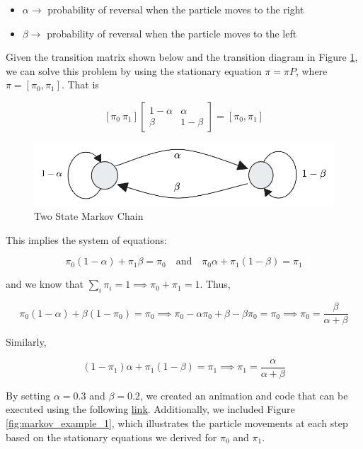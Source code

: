 \documentclass[a4paper,10pt]{article}
\begin{document}
\begin{itemize}
    \item $\alpha \rightarrow$ probability of reversal when the particle moves to the right 
    \item $\beta \rightarrow$ probability of reversal when the particle moves to the left 
\end{itemize}

Given the transition matrix shown below and the transition diagram in Figure \ref{fig:two_state_markov}, we can solve this problem by using the stationary equation $\pi = \pi P$, where $\pi = [\pi_0, \pi_1]$. That is

\[
[\pi_0 \ \pi_1] \begin{bmatrix}
1 - \alpha & \alpha \\
\beta & 1 - \beta 
\end{bmatrix} = [\pi_0, \pi_1]
\]

\begin{figure}[ht]
\centering
\includegraphics[width=0.6\linewidth]{Figures/two_state_markov.png}
\caption{Two State Markov Chain}
\label{fig:two_state_markov}
\end{figure}

This implies the system of equations:

\[
\pi_0(1 - \alpha) + \pi_1 \beta = \pi_0 \quad \text{and} \quad \pi_0 \alpha + \pi_1(1 - \beta) = \pi_1
\]

and we know that $\sum_i \pi_i = 1 \implies \pi_0 + \pi_1 = 1$. Thus,

\[
\pi_0(1 - \alpha) + \beta(1 - \pi_0) = \pi_0 \implies \pi_0 - \alpha \pi_0 + \beta - \beta \pi_0 = \pi_0 \implies \pi_0 = \frac{\beta}{\alpha + \beta}
\]

Similarly,

\[
(1 - \pi_1)\alpha + \pi_1(1 - \beta) = \pi_1 \implies \pi_1 = \frac{\alpha}{\alpha + \beta}
\]

By setting $\alpha = 0.3$ and $\beta = 0.2$, we created an animation and code that can be executed using the following \href{https://github.com/igor17400/information-theory-174/blob/main/notebooks/markov.ipynb}{link}. Additionally, we included Figure \ref{fig:markov_example_1}, which illustrates the particle movements at each step based on the stationary equations we derived for $\pi_0$ and $\pi_1$.
\end{document}
